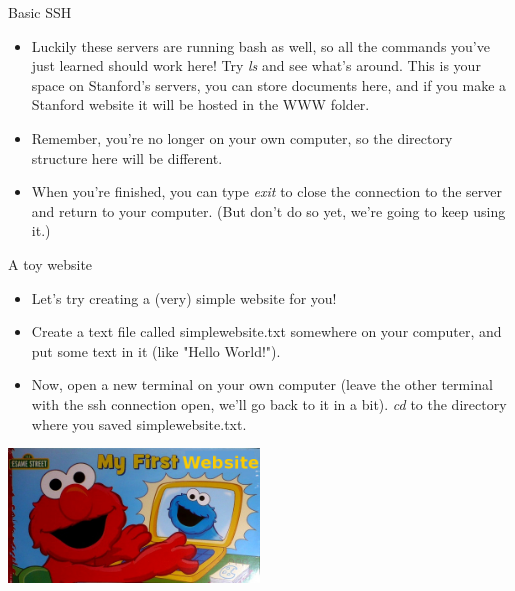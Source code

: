 \documentclass{beamer}
\begin{document}
\begin{frame}{Basic SSH}
\begin{itemize}
    \item Luckily these servers are running bash as well, so all the commands you've just learned should work here! Try \emph{ls} and see what's around. This is your space on Stanford's servers, you can store documents here, and if you make a Stanford website it will be hosted in the WWW folder. 
    \item Remember, you're no longer on your own computer, so the directory structure here will be different. 
    \item When you're finished, you can type \emph{exit} to close the connection to the server and return to your computer. (But don't do so yet, we're going to keep using it.)
\end{itemize}
\end{frame}

\begin{frame}{A toy website}
\begin{itemize}
    \item<1-> Let's try creating a (very) simple website for you!
    \item<2-> Create a text file called simplewebsite.txt somewhere on your computer, and put some text in it (like "Hello World!"). 
    \item<3-> Now, open a new terminal on your own computer (leave the other terminal with the ssh connection open, we'll go back to it in a bit). \emph{cd} to the directory where you saved simplewebsite.txt.  
\end{itemize}
\begin{center}
\includegraphics[width = 0.5\textwidth]{images/firstwebsite.jpg}
\end{center}
\end{frame}
\end{document}
